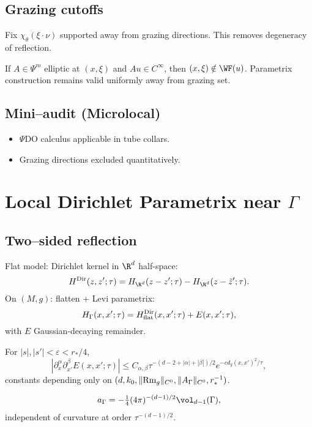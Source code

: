 \subsection{Grazing cutoffs}
Fix $\chi_\theta(\xi\cdot\nu)$ supported away from grazing directions. 
This removes degeneracy of reflection.

\begin{proposition}
If $A\in\Psi^m$ elliptic at $(x,\xi)$ and $Au\in C^\infty$, then $(x,\xi)\notin \WF(u)$. 
Parametrix construction remains valid uniformly away from grazing set.
\end{proposition}

\subsection*{Mini–audit (Microlocal)}
\begin{itemize}
  \item $\Psi$DO calculus applicable in tube collars.
  \item Grazing directions excluded quantitatively.
\end{itemize}

\section{Local Dirichlet Parametrix near $\Gamma$}
\label{sec:parametrix-gamma}

\subsection{Two–sided reflection}
Flat model: Dirichlet kernel in $\R^d$ half-space:
\[
H^{\rm Dir}(z,z';\tau)=H_{\R^d}(z-z';\tau)-H_{\R^d}(z-\tilde z';\tau).
\]
On $(M,g)$: flatten + Levi parametrix:
\[
H_\Gamma(x,x';\tau)=H^{\rm Dir}_{\rm flat}(x,x';\tau)+E(x,x';\tau),
\]
with $E$ Gaussian-decaying remainder.

\begin{proposition}
\label{prop:uniform-E}
For $|s|,|s'|<\varepsilon<r_*/4$, 
\[
|\partial_x^\alpha \partial_{x'}^\beta E(x,x';\tau)|
\le C_{\alpha,\beta}\tau^{-(d-2+|\alpha|+|\beta|)/2} e^{-c d_g(x,x')^2/\tau},
\]
constants depending only on $(d,k_0,\|{\rm Rm}_g\|_{C^0},\|A_\Gamma\|_{C^0},r_*^{-1})$.
\end{proposition}

\begin{corollary}
\[
a_\Gamma=-\tfrac14(4\pi)^{-(d-1)/2}\vol_{d-1}(\Gamma),
\]
independent of curvature at order $\tau^{-(d-1)/2}$.
\end{corollary}

